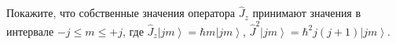 \documentclass[__main__.tex]{subfiles}
\begin{document}
Покажите, что собственные значения оператора $\hat{J}_z$ принимают значения в интервале $-j\le m\le +j$, где $\hat{J}_z\left|jm\right>=\hbar m\left|jm\right>$, $\hat{J}^2\left|jm\right>=\hbar^2 j(j+1)\left|jm\right>$.\\ 

\end{document}
